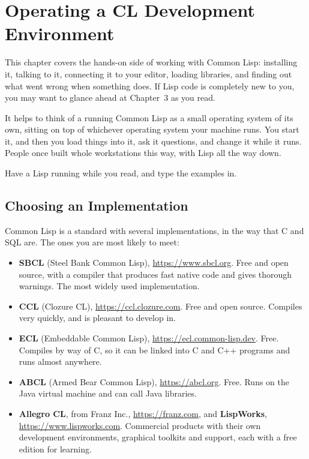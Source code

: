 \chapter{Operating a CL Development Environment}

This chapter covers the hands-on side of working with Common Lisp:
installing it, talking to it, connecting it to your editor, loading
libraries, and finding out what went wrong when something does. If
Lisp code is completely new to you, you may want to glance ahead at
Chapter~3 as you read.

It helps to think of a running Common Lisp as a small operating system
of its own, sitting on top of whichever operating system your machine
runs. You start it, and then you load things into it, ask it
questions, and change it while it runs. People once built whole
workstations this way, with Lisp all the way down.

Have a Lisp running while you read, and type the examples in.

\section{Choosing an Implementation}

Common Lisp is a standard with several implementations, in the way
that C and SQL are. The ones you are most likely to meet:

\begin{itemize}
\item \textbf{SBCL} (Steel Bank Common Lisp), \url{https://www.sbcl.org}.
Free and open source, with a compiler that produces fast native code
and gives thorough warnings. The most widely used implementation.

\item \textbf{CCL} (Clozure CL), \url{https://ccl.clozure.com}. Free and
open source. Compiles very quickly, and is pleasant to develop in.

\item \textbf{ECL} (Embeddable Common Lisp),
\url{https://ecl.common-lisp.dev}. Free. Compiles by way of C, so
it can be linked into C and C++ programs and runs almost anywhere.

\item \textbf{ABCL} (Armed Bear Common Lisp), \url{https://abcl.org}.
Free. Runs on the Java virtual machine and can call Java libraries.

\item \textbf{Allegro CL}, from Franz Inc., \url{https://franz.com}, and
\textbf{LispWorks}, \url{https://www.lispworks.com}. Commercial
products with their own development environments, graphical toolkits
and support, each with a free edition for learning.
\end{itemize}

